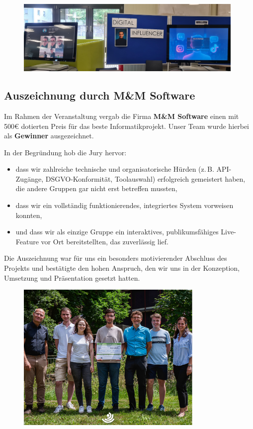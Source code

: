 \documentclass[a4paper,12pt]{article}
\begin{document}
\begin{figure}[h] %
  \centering
  \includegraphics[width=0.98\textwidth]{images/220250704_110638.jpg}
\end{figure}


\subsection{Auszeichnung durch M\&M Software}

Im Rahmen der Veranstaltung vergab die Firma \textbf{M\&M Software} einen mit 500€ dotierten Preis für das beste Informatikprojekt. Unser Team wurde hierbei als \textbf{Gewinner} ausgezeichnet.

In der Begründung hob die Jury hervor:

\begin{itemize}
    \item dass wir zahlreiche technische und organisatorische Hürden (z.\,B. API-Zugänge, DSGVO-Konformität, Toolauswahl) erfolgreich gemeistert haben, die andere Gruppen gar nicht erst betreffen mussten,
    \item dass wir ein vollständig funktionierendes, integriertes System vorweisen konnten,
    \item und dass wir als einzige Gruppe ein interaktives, publikumsfähiges Live-Feature vor Ort bereitstellten, das zuverlässig lief.
\end{itemize}

Die Auszeichnung war für uns ein besonders motivierender Abschluss des Projekts und bestätigte den hohen Anspruch, den wir uns in der Konzeption, Umsetzung und Präsentation gesetzt hatten.

\begin{figure}[h] %
  \centering
  \includegraphics[width=0.8\textwidth]{images/Untitled-1.png}
\end{figure}
\end{document}
